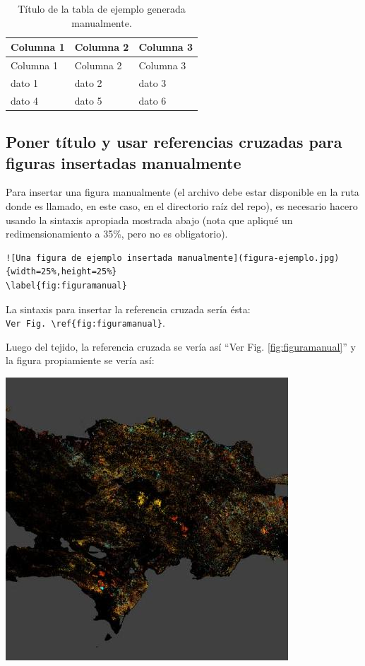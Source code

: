 \documentclass[spanish]{article}
\begin{document}
\begin{longtable}[]{@{}lll@{}}
\caption{Título de la tabla de ejemplo generada
manualmente.\label{tab:tablaejemplomanualmente}}\tabularnewline
\toprule\noalign{}
Columna 1 & Columna 2 & Columna 3 \\
\midrule\noalign{}
\endfirsthead
\toprule\noalign{}
Columna 1 & Columna 2 & Columna 3 \\
\midrule\noalign{}
\endhead
\bottomrule\noalign{}
\endlastfoot
dato 1 & dato 2 & dato 3 \\
dato 4 & dato 5 & dato 6 \\
\end{longtable}

\subsection{Poner título y usar referencias cruzadas para figuras
insertadas
manualmente}\label{poner-tuxedtulo-y-usar-referencias-cruzadas-para-figuras-insertadas-manualmente}

Para insertar una figura manualmente (el archivo debe estar disponible
en la ruta donde es llamado, en este caso, en el directorio raíz del
repo), es necesario hacero usando la sintaxis apropiada mostrada abajo
(nota que apliqué un redimensionamiento a 35\%, pero no es obligatorio).

\begin{Verbatim}[samepage=true]
![Una figura de ejemplo insertada manualmente](figura-ejemplo.jpg){width=25%,height=25%}
\label{fig:figuramanual}
\end{Verbatim}

La sintaxis para insertar la referencia cruzada sería ésta:
\texttt{Ver\ Fig.\ \textbackslash{}ref\{fig:figuramanual\}}.

Luego del tejido, la referencia cruzada se vería así ``Ver Fig.
\ref{fig:figuramanual}'' y la figura propiamiente se vería así:

\includegraphics{figura-ejemplo.jpg} \label{fig:figuramanual}
\end{document}
